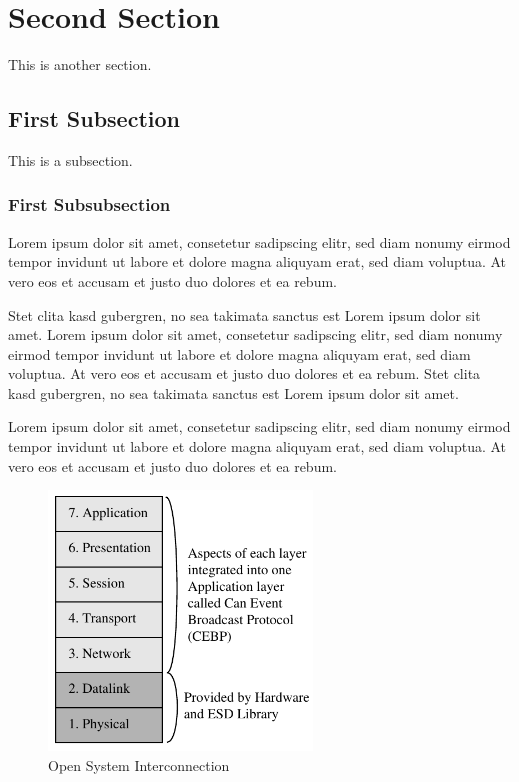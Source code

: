 \section{Second Section}
This is another section.

\subsection{First Subsection}
This is a subsection.

\subsubsection{First Subsubsection}
\label{sec:subsubectionname}
Lorem ipsum dolor sit amet, consetetur sadipscing elitr, sed diam nonumy eirmod tempor invidunt ut labore et dolore magna aliquyam erat, sed diam voluptua. At vero eos et accusam et justo duo dolores et ea rebum.

Stet clita kasd gubergren, no sea takimata sanctus est Lorem ipsum dolor sit amet. Lorem ipsum dolor sit amet, consetetur sadipscing elitr, sed diam nonumy eirmod tempor invidunt ut labore et dolore magna aliquyam erat, sed diam voluptua. At vero eos et accusam et justo duo dolores et ea rebum. Stet clita kasd gubergren, no sea takimata sanctus est Lorem ipsum dolor sit amet.

Lorem ipsum dolor sit amet, consetetur sadipscing elitr, sed diam nonumy eirmod tempor invidunt ut labore et dolore magna aliquyam erat, sed diam voluptua. At vero eos et accusam et justo duo dolores et ea rebum.

\begin{figure}
\centering
\includegraphics[width=7cm]{pictures/OSI.pdf} %
\caption{Open System Interconnection}
\label{fig:OSI}
\end{figure}

